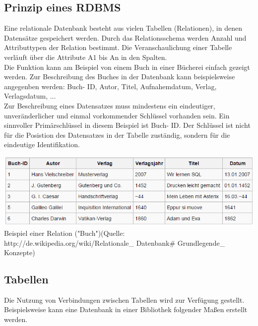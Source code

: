 \documentclass[12pt,a4paper]{report}
\begin{document}
\begin{onehalfspace}
\subsection{Prinzip eines RDBMS}
Eine relationale Datenbank besteht aus vielen Tabellen (Relationen), in denen Datensätze gespeichert werden. Durch das Relationsschema werden Anzahl und Attributtypen der Relation bestimmt. Die Veranschaulichung einer Tabelle verläuft über die Attribute A1 bis An in den Spalten.\\

Die Funktion kann am Beispiel von einem Buch in einer Bücherei einfach gezeigt werden. Zur Beschreibung des Buches in der Datenbank kann beispielsweise angegenben werden: Buch- ID, Autor, Titel, Aufnahemdatum, Verlag, Verlagsdatum, ...
\\Zur Beschreibung eines Datensatzes muss mindestens ein eindeutiger, unveränderlicher und einmal vorkommender Schlüssel vorhanden sein. Ein sinnvoller Primärschlüssel in diesem Beispiel ist Buch- ID. Der Schlüssel ist nicht für die Posistion des Datensatzes in der Tabelle zuständig, sondern für die eindeutige Identifikation.

\begin{center}
\includegraphics[scale=0.8]{img/relation_DB.png}\\
Beispiel einer Relation ("{}Buch"{})(Quelle: http://de.wikipedia.org/wiki/Relationale\_ Datenbank\# Grundlegende\_ Konzepte)
\end{center}

\subsection{Tabellen}
Die Nutzung von Verbindungen zwischen Tabellen wird zur Verfügung gestellt. Beispielsweise kann eine Datenbank in einer Bibliothek folgender Maßen erstellt werden.\\


\end{onehalfspace}
\end{document}
